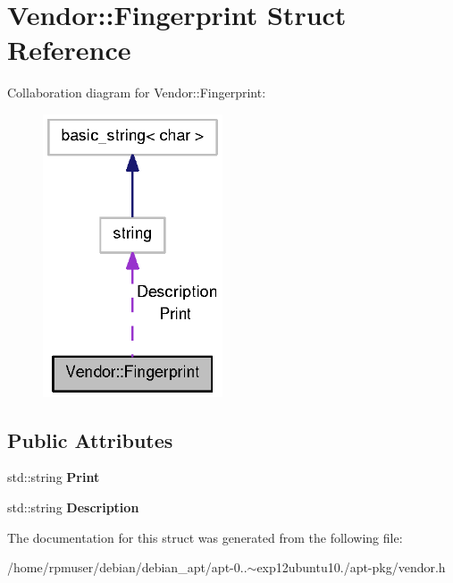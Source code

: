 \section{\-Vendor\-:\-:\-Fingerprint \-Struct \-Reference}
\label{structVendor_1_1Fingerprint}


\-Collaboration diagram for \-Vendor\-:\-:\-Fingerprint\-:
\nopagebreak
\begin{figure}[H]
\begin{center}
\leavevmode
\includegraphics[width=151pt]{structVendor_1_1Fingerprint__coll__graph}
\end{center}
\end{figure}
\subsection*{\-Public \-Attributes}
\begin{DoxyCompactItemize}
\item 
std\-::string {\bfseries \-Print}\label{structVendor_1_1Fingerprint_ab15473024f5be405e0c5fddf385999b8}

\item 
std\-::string {\bfseries \-Description}\label{structVendor_1_1Fingerprint_a72a1a381861908396ddca53a1fa28f97}

\end{DoxyCompactItemize}


\-The documentation for this struct was generated from the following file\-:\begin{DoxyCompactItemize}
\item 
/home/rpmuser/debian/debian\-\_\-apt/apt-\/0..$\sim$exp12ubuntu10./apt-\/pkg/vendor.\-h\end{DoxyCompactItemize}
